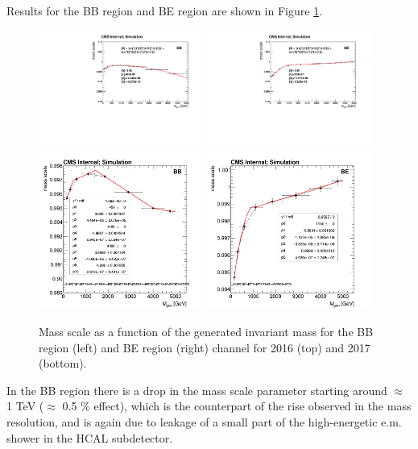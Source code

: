 Results for the BB region and BE region are shown in Figure \ref{fig:scale}.

\begin{figure}[ht]
\centering
\includegraphics[width=0.48\textwidth]{figures/Zprime/2016/mass_resolution/scale_BB.pdf}
\includegraphics[width=0.48\textwidth]{figures/Zprime/2016/mass_resolution/scale_BE.pdf}
\includegraphics[width=0.48\textwidth]{figures/Zprime/2017/mass_resolution/High_Mass/BB_mean}
\includegraphics[width=0.48\textwidth]{figures/Zprime/2017/mass_resolution/High_Mass/BE_mean}
\caption{Mass scale as a function of the generated invariant mass for the BB region (left) and BE region (right) channel for 2016 (top) and 2017 (bottom).
 \label{fig:scale}}
\end{figure}

In the BB region there is a drop in the mass scale parameter starting around $\approx$ 1 TeV ($\approx$ 0.5 \% effect), which is the counterpart of the rise observed in the mass resolution, and is again due to leakage of a small part of the high-energetic e.m. shower in the HCAL subdetector.

